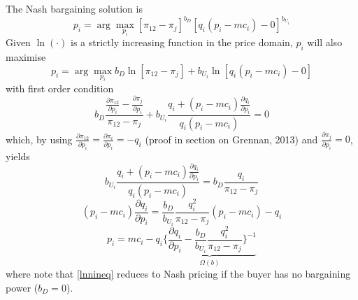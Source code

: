 \documentclass[11pt]{article}
\numberwithin{equation}{section}
\begin{document}
The Nash bargaining solution is
\begin{equation}
\label{nin}
p_i = \arg \max_{p_i} [\pi_{12} - \pi_j]^{b_D}[q_i(p_i - mc_i) - 0]^{b_{U_i}}
\end{equation}
Given $\ln(\cdot)$ is a strictly increasing function in the price domain, $p_i$ will also maximise
\begin{equation}
\label{lnnin}
p_i = \arg \max_{p_i} b_D \ln [\pi_{12} - \pi_j] + b_{U_i} \ln[q_i(p_i - mc_i) - 0]
\end{equation}
with first order condition
\begin{equation*}
	b_D \frac{\frac{\partial \pi_{12}}{\partial p_i} - \frac{\partial \pi_j}{\partial p_i}}{\pi_{12} - \pi_j} + b_{U_i}\frac{q_i + (p_i - mc_i) \frac{\partial q_i}{\partial p_i}}{q_i(p_i - mc_i)} = 0
\end{equation*}
which, by using $\frac{\partial \pi_{12}}{\partial p_i} = \frac{\partial \pi_i}{\partial p_i} = - q_i$ (proof in section on Grennan, 2013) and $\frac{\partial \pi_j}{\partial p_i} = 0$, yields
\begin{equation*}
	b_{U_i}\frac{q_i + (p_i - mc_i) \frac{\partial q_i}{\partial p_i}}{q_i(p_i - mc_i)} = b_D \frac{q_i }{\pi_{12} - \pi_j}
\end{equation*}
\begin{equation*}
	(p_i - mc_i) \frac{\partial q_i}{\partial p_i} = \frac{b_D}{b_{U_i}}\frac{q^2_i}{\pi_{12} - \pi_j}(p_i - mc_i) - q_i
\end{equation*}
\begin{equation}
\label{lnnineq}
	p_i = mc_i - q_i \underbrace{\bigg\{ \frac{\partial q_i}{\partial p_i} - \frac{b_D}{b_{U_i}}\frac{q^2_i}{\pi_{12} - \pi_j} \bigg\}^{-1}}_{\Omega(b)}
\end{equation}
where note that \eqref{lnnineq} reduces to Nash pricing if the buyer has no bargaining power ($b_D = 0$). \\
\end{document}

